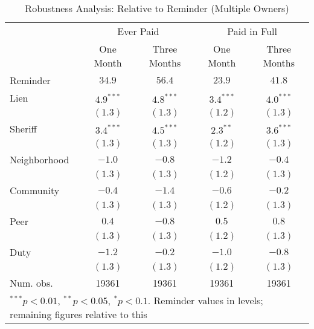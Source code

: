 \begin{table}[htbp]
\caption{Robustness Analysis: Relative to Reminder (Multiple Owners)}
\begin{center}
\begin{tabular}{l c c c c }
\hline
 & \multicolumn{2}{c}{Ever Paid} & \multicolumn{2}{c}{Paid in Full} \\
 & One Month & Three Months & One Month & Three Months \\
Reminder     & $34.9$ & $56.4$ & $23.9$ & $41.8$ \\
\hline
Lien         & $4.9^{***}$  & $4.8^{***}$  & $3.4^{***}$  & $4.0^{***}$  \\
             & $(1.3)$      & $(1.3)$      & $(1.2)$      & $(1.3)$      \\
Sheriff      & $3.4^{***}$  & $4.5^{***}$  & $2.3^{**}$   & $3.6^{***}$  \\
             & $(1.3)$      & $(1.3)$      & $(1.2)$      & $(1.3)$      \\
Neighborhood & $-1.0$       & $-0.8$       & $-1.2$       & $-0.4$       \\
             & $(1.3)$      & $(1.3)$      & $(1.2)$      & $(1.3)$      \\
Community    & $-0.4$       & $-1.4$       & $-0.6$       & $-0.2$       \\
             & $(1.3)$      & $(1.3)$      & $(1.2)$      & $(1.3)$      \\
Peer         & $0.4$        & $-0.8$       & $0.5$        & $0.8$        \\
             & $(1.3)$      & $(1.3)$      & $(1.2)$      & $(1.3)$      \\
Duty         & $-1.2$       & $-0.2$       & $-1.0$       & $-0.8$       \\
             & $(1.3)$      & $(1.3)$      & $(1.2)$      & $(1.3)$      \\
\hline
Num. obs.    & 19361        & 19361        & 19361        & 19361        \\
\hline
\multicolumn{5}{l}{\scriptsize{$^{***}p<0.01$, $^{**}p<0.05$, $^*p<0.1$. Reminder values in levels; remaining figures relative to this}}
\end{tabular}
\label{sh_lpm_mult}
\end{center}
\end{table}
